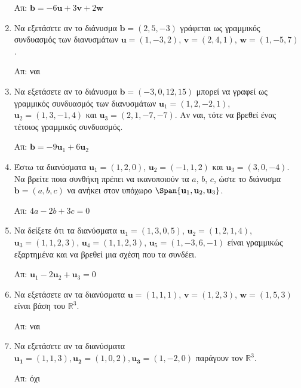 \begin{enumerate}
    \hfill Απ: $ \mathbf{b} = -6 \mathbf{u} + 3 \mathbf{v} +2 \mathbf{w} $ 	

  \item\label{ask:eksart2} Να εξετάσετε αν το διάνυσμα $ \mathbf{b} = (2,5,-3) $ 
    γράφεται ως γραμμικός συνδυασμός των διανυσμάτων $ \mathbf{u} = (1,-3,2)$, 
    $ \mathbf{v} = (2,4,1)$, $ \mathbf{w} = (1,-5,7) $.

    \hfill Απ: ναι 

  \item Να εξετάσετε αν το διάνυσμα $ \mathbf{b} = (-3,0,12,15) $ μπορεί να γραφεί 
    ως γραμμικός συνδυασμός των διανυσμάτων $ \mathbf{u}_{1} = (1,2,-2,1) $, 
    $ \mathbf{u}_{2} = (1,3,-1,4) $ και $ \mathbf{u}_{3} = (2,1,-7,-7) $. 
    Αν ναι, τότε να βρεθεί ένας τέτοιος γραμμικός συνδυασμός.

    \hfill Απ: $ \mathbf{b} = -9 \mathbf{u}_{1} + 6 \mathbf{u}_{2} $ 

  \item\label{ask:eksart3} Έστω τα διανύσματα $ \mathbf{u}_{1} = (1,2,0) $, 
    $ \mathbf{u}_{2} = (-1,1,2) $ 
    και $ \mathbf{u}_{3} = (3,0,-4) $. Να βρείτε ποια συνθήκη πρέπει να ικανοποιούν τα 
    $a$, $b$, $c$, ώστε το διάνυσμα $ \mathbf{b} = (a,b,c) $ να ανήκει στον υπόχωρο 
    $ \Span \{ \mathbf{u}_{1}, \mathbf{u}_{2}, \mathbf{u}_{3} \} $.

    \hfill Απ: $ 4a -2b + 3c = 0 $ 

  \item\label{ask:synd} Να δείξετε ότι τα διανύσματα $ \mathbf{u}_{1} = (1,3,0,5) $, 
    $ \mathbf{u}_{2} = (1,2,1,4) $, $ \mathbf{u}_{3} = (1,1,2,3)$, 
    $ \mathbf{u}_{4} = (1,1,2,3) $, $ \mathbf{u}_{5} = (1,-3,6,-1) $ 
    είναι γραμμικώς εξαρτημένα και να βρεθεί μια σχέση που τα συνδέει. 

    \hfill Απ: $ \mathbf{u}_{1} - 2 \mathbf{u}_{2} + \mathbf{u}_{3} = 0 $ 

  \item\label{ask:baseeks} Να εξετάσετε αν τα διανύσματα $ \mathbf{u} = (1,1,1)$, 
    $ \mathbf{v} = (1,2,3)$, $ \mathbf{w} = (1,5,3) $ είναι βάση του $\mathbb{R}^{3}$. 

    \hfill Απ: ναι 

  \item\label{ask:parag} Να εξετάσετε αν τα διανύσματα $ \mathbf{u_{1}} = (1,1,3), 
    \mathbf{u_{2}} = (1,0,2), \mathbf{u_{3}}= (1,-2,0)$ παράγουν τον $ \mathbb{R}^{3} $.

    \hfill Απ: όχι 


\end{enumerate}
